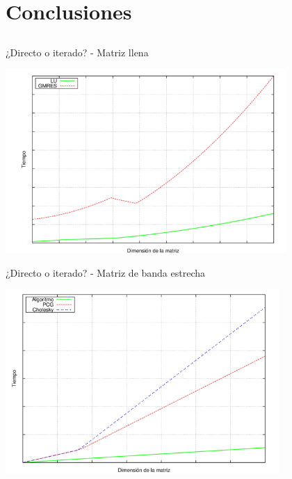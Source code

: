 \documentclass [8pt] {beamer}
\begin{document}
\section{Conclusiones}
    \subsection{}
        \begin{frame}{¿Directo o iterado? - Matriz llena}
            \begin{center}
                \includegraphics[height=7cm]{m_llena.png}
            \end{center}
        \end{frame}
        \begin{frame}{¿Directo o iterado? - Matriz de banda estrecha}
            \begin{center}
                \includegraphics[height=7cm]{m-simetricaestrecha.png}
            \end{center}
        \end{frame}
\end{document}
